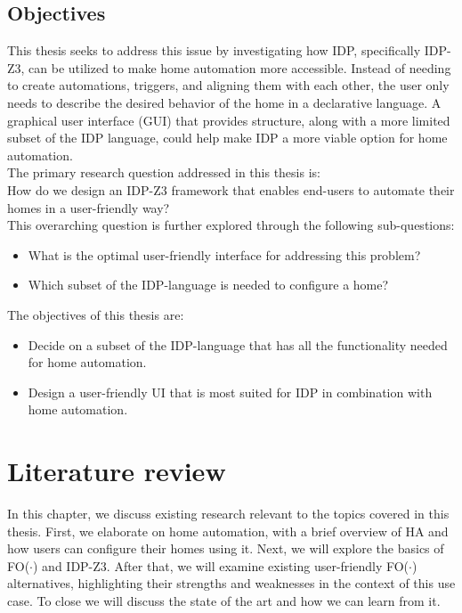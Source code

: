 \documentclass[11pt,a4paper]{report}
\newcommand{\fodot}{FO($\cdot$)\xspace}
\begin{document}
\section{Objectives}
This thesis seeks to address this issue by investigating how IDP, specifically IDP-Z3, can be utilized to make home automation more accessible. Instead of needing to create automations, triggers, and aligning them with each other, the user only needs to describe the desired behavior of the home in a declarative language. A graphical user interface (GUI) that provides structure, along with a more limited subset of the IDP language, could help make IDP a more viable option for home automation.\\
The primary research question addressed in this thesis is:\\
How do we design an IDP-Z3 framework that enables end-users to automate their homes in a user-friendly way?\\
This overarching question is further explored through the following sub-questions:
\begin{itemize}
    \item What is the optimal user-friendly interface for addressing this problem?
    \item Which subset of the IDP-language is needed to configure a home?
\end{itemize}
The objectives of this thesis are:
\begin{itemize}
    \item Decide on a subset of the IDP-language that has all the functionality needed for home automation.
    \item Design a user-friendly UI that is most suited for IDP in combination with home automation.
\end{itemize}





\chapter{Literature review}
In this chapter, we discuss existing research relevant to the topics covered in this thesis. First, we elaborate on home automation, with a brief overview of HA and how users can configure their homes using it. Next, we will explore the basics of \fodot and IDP-Z3. After that, we will examine existing user-friendly \fodot alternatives, highlighting their strengths and weaknesses in the context of this use case. To close we will discuss the state of the art and how we can learn from it.
\end{document}

